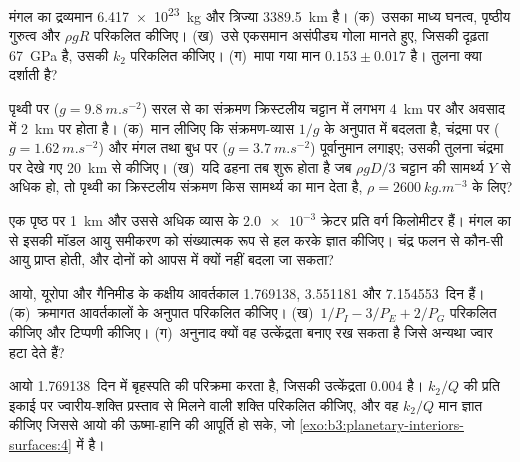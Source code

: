 \begin{exercise}[$\star\star$]\label{exo:b3:planetary-interiors-surfaces:5}
मंगल का द्रव्यमान \qty{6.417e23}{kg} और त्रिज्या \qty{3389.5}{km} है।
(क)~उसका माध्य घनत्व, पृष्ठीय गुरुत्व और $\rho gR$ परिकलित कीजिए।
(ख)~उसे एकसमान असंपीड्य गोला मानते हुए, जिसकी दृढ़ता
\qty{67}{GPa} है, उसकी  $k_2$ परिकलित कीजिए। (ग)~मापा गया मान
$0.153 \pm 0.017$ है। तुलना क्या दर्शाती है?
\end{exercise}

\begin{exercise}[$\star\star$]\label{exo:b3:planetary-interiors-surfaces:6}
पृथ्वी पर ($g = \qty{9.8}{m.s^{-2}}$) सरल से  का संक्रमण
क्रिस्टलीय चट्टान में लगभग \qty{4}{km} पर और
अवसाद में \qty{2}{km} पर होता है। (क)~मान लीजिए कि संक्रमण-व्यास $1/g$ के अनुपात में बदलता है,
चंद्रमा पर ($g = \qty{1.62}{m.s^{-2}}$) और मंगल तथा
बुध पर ($g = \qty{3.7}{m.s^{-2}}$) पूर्वानुमान लगाइए; उसकी तुलना
चंद्रमा पर देखे गए \qty{20}{km} से कीजिए। (ख)~यदि ढहना तब शुरू होता है जब $\rho gD/3$
चट्टान की सामर्थ्य $Y$ से अधिक हो, तो पृथ्वी का क्रिस्टलीय संक्रमण
किस सामर्थ्य का मान देता है, $\rho = \qty{2600}{kg.m^{-3}}$ के लिए?
\end{exercise}

\begin{exercise}[$\star\star$]\label{exo:b3:planetary-interiors-surfaces:7}
एक पृष्ठ पर \qty{1}{km} और उससे अधिक व्यास के $\num{2.0e-3}$ क्रेटर
प्रति वर्ग किलोमीटर हैं। मंगल का  से इसकी मॉडल आयु
समीकरण को संख्यात्मक रूप से हल करके ज्ञात कीजिए। चंद्र फलन से कौन-सी आयु प्राप्त होती,
और दोनों को आपस में क्यों नहीं बदला जा सकता?
\end{exercise}

\begin{exercise}[$\star\star$]\label{exo:b3:planetary-interiors-surfaces:8}
आयो, यूरोपा और गैनिमीड के कक्षीय आवर्तकाल 1.769138, 3.551181 और
\num{7.154553}~दिन हैं। (क)~क्रमागत आवर्तकालों के अनुपात परिकलित कीजिए।
(ख)~$1/P_I - 3/P_E + 2/P_G$ परिकलित कीजिए और टिप्पणी कीजिए। (ग)~अनुनाद
क्यों वह उत्केंद्रता बनाए रख सकता है जिसे अन्यथा ज्वार हटा देते हैं?
\end{exercise}

\begin{exercise}[$\star\star$]\label{exo:b3:planetary-interiors-surfaces:9}
आयो \num{1.769138}~दिन में बृहस्पति की परिक्रमा करता है, जिसकी उत्केंद्रता 0.004 है।
$k_2/Q$ की प्रति इकाई पर ज्वारीय-शक्ति प्रस्ताव से मिलने वाली शक्ति परिकलित कीजिए,
और वह $k_2/Q$ मान ज्ञात कीजिए जिससे आयो की ऊष्मा-हानि की आपूर्ति हो सके,
जो \cref{exo:b3:planetary-interiors-surfaces:4} में है।
\end{exercise}

